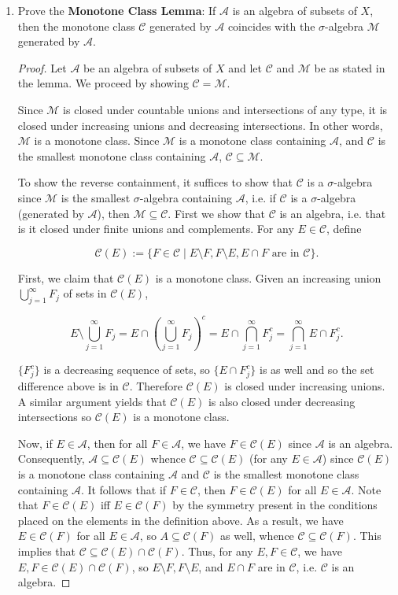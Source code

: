 \documentclass[11pt,oneside,english]{amsart}
\theoremstyle{definition}
\newcommand{\MC}[1]{\mathcal{#1}}
\begin{document}
\begin{enumerate}
\pagebreak

\item Prove the \textbf{Monotone Class Lemma}: If $\MC{A}$ is an algebra of subsets of $X$, then the monotone class $\MC{C}$ generated by $\MC{A}$ coincides with the $\sigma$-algebra $\MC{M}$ generated by $\MC{A}$.

\begin{proof}
Let $\MC{A}$ be an algebra of subsets of $X$ and let $\MC{C}$ and $\MC{M}$ be as stated in the lemma. We proceed by showing $\MC{C}=\MC{M}$. 

Since $\MC{M}$ is closed under countable unions and intersections of any type, it is closed under increasing unions and decreasing intersections. In other words, $\MC{M}$ is a monotone class. Since $\MC{M}$ is a monotone class containing $\MC{A}$, and $\MC{C}$ is the smallest monotone class containing $\MC{A}$, $\MC{C}\subseteq\MC{M}$.

To show the reverse containment, it suffices to show that $\MC{C}$ is a $\sigma$-algebra since $\MC{M}$ is the smallest $\sigma$-algebra containing $\MC{A}$, i.e. if $\MC{C}$ is a $\sigma$-algebra (generated by $\MC{A}$), then $\MC{M}\subseteq \MC{C}$. First we show that $\MC{C}$ is an algebra, i.e. that is it closed under finite unions and complements. For any $E\in\MC{C}$, define

\[
\MC{C}(E):=\{F\in\MC{C}\mid E\setminus F,F\setminus E,E\cap F\text{ are in }\MC{C}\}.
\]

First, we claim that $\MC{C}(E)$ is a monotone class. Given an increasing union $\bigcup_{j=1}^\infty F_j$ of sets in $\MC{C}(E)$,

\[
E\setminus\bigcup_{j=1}^\infty F_j=E\cap\left(\bigcup_{j=1}^\infty F_j\right)^c=E\cap\bigcap_{j=1}^\infty F_j^c=\bigcap_{j=1}^\infty E\cap F_j^c.
\]

$\{F_j^c\}$ is a decreasing sequence of sets, so $\{E\cap F_j^c\}$ is as well and so the set difference above is in $\MC{C}$. Therefore $\MC{C}(E)$ is closed under increasing unions. A similar argument yields that $\MC{C}(E)$ is also closed under decreasing intersections so $\MC{C}(E)$ is a monotone class.

Now, if $E\in\MC{A}$, then for all $F\in\MC{A}$, we have $F\in\MC{C}(E)$ since $\MC{A}$ is an algebra. Consequently, $\MC{A}\subseteq\MC{C}(E)$ whence $\MC{C}\subseteq\MC{C}(E)$ (for any $E\in\MC{A}$) since $\MC{C}(E)$ is a monotone class containing $\MC{A}$ and $\MC{C}$ is the smallest monotone class containing $\MC{A}$. It follows that if $F\in\MC{C}$, then $F\in\MC{C}(E)$ for all $E\in \MC{A}$. Note that $F\in\MC{C}(E)$ iff $E\in\MC{C}(F)$ by the symmetry present in the conditions placed on the elements in the definition above. As a result, we have $E\in\MC{C}(F)$ for all $E\in\MC{A}$, so $A\subseteq\MC{C}(F)$ as well, whence $\MC{C}\subseteq\MC{C}(F)$. This implies that $\MC{C}\subseteq\MC{C}(E)\cap\MC{C}(F)$. Thus, for any $E,F\in\MC{C}$, we have $E,F\in\MC{C}(E)\cap\MC{C}(F)$, so $E\setminus F, F\setminus E$, and $E\cap F$ are in $\MC{C}$, i.e. $\MC{C}$ is an algebra.


\end{proof}
\end{enumerate}
\end{document}
